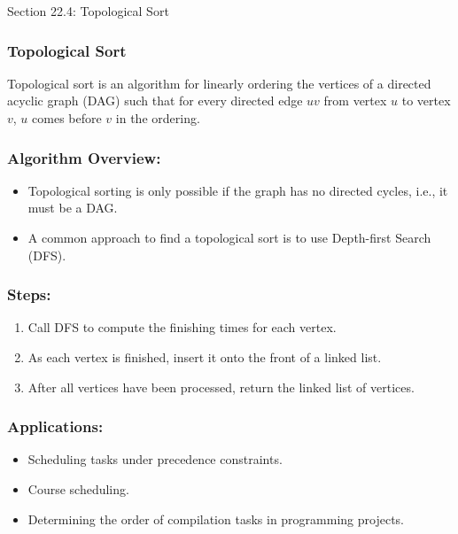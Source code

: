 \begin{notes}{Section 22.4: Topological Sort}
    \subsubsection*{Topological Sort}

    Topological sort is an algorithm for linearly ordering the vertices of a directed acyclic graph (DAG) such that for every directed edge $uv$ from vertex $u$ to vertex $v$, $u$ comes before $v$ in 
    the ordering. \vspace*{1em}
    
    \subsubsection*{Algorithm Overview:}
    \begin{itemize}
        \item Topological sorting is only possible if the graph has no directed cycles, i.e., it must be a DAG.
        \item A common approach to find a topological sort is to use Depth-first Search (DFS).
    \end{itemize}
    
    \subsubsection*{Steps:}
    \begin{enumerate}
        \item Call DFS to compute the finishing times for each vertex.
        \item As each vertex is finished, insert it onto the front of a linked list.
        \item After all vertices have been processed, return the linked list of vertices.
    \end{enumerate}
    
    \subsubsection*{Applications:}
    \begin{itemize}
        \item Scheduling tasks under precedence constraints.
        \item Course scheduling.
        \item Determining the order of compilation tasks in programming projects.
    \end{itemize}
    

\end{notes}
